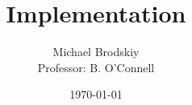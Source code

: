 


\title{Implementation}
\date{\today}
\author{Michael Brodskiy\\ \small Professor: B. O'Connell}



\maketitle

